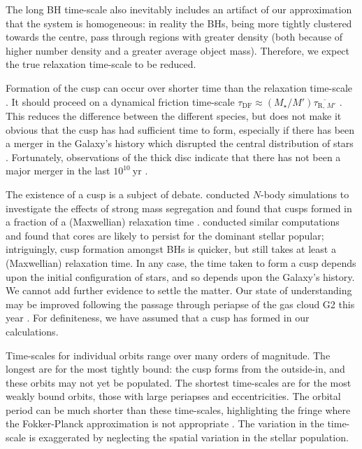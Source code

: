 \documentclass[useAMS,usedcolumn,usegraphicx,usenatbib]{mn2e}
\newcommand{\units}[1]{\ensuremath{~\mathrm{#1}}}
\newcommand{\sub}[1]{\ensuremath{_\mathrm{#1}}}
\begin{document}
\begin{onecolumn}
The long BH time-scale also inevitably includes an artifact of our approximation that the system is homogeneous: in reality the BHs, being more tightly clustered towards the centre, pass through regions with greater density (both because of higher number density and a greater average object mass). Therefore, we expect the true relaxation time-scale to be reduced. 

Formation of the cusp can occur over shorter time than the relaxation time-scale \citep{Bar-Or2012}. It should proceed on a dynamical friction time-scale $\tau\sub{DF} \approx (M_\star/M')\overline{\tau_{\mathrm{R},\,M'}}$ \citep[section 3.4]{Spitzer1987}. This reduces the difference between the different species, but does not make it obvious that the cusp has had sufficient time to form, especially if there has been a merger in the Galaxy's history which disrupted the central distribution of stars \citep{Gualandris2012}. Fortunately, observations of the thick disc indicate that there has not been a major merger in the last $10^{10}\units{yr}$ \citep{Wyse2008}.

The existence of a cusp is a subject of debate. \citet{Preto2010} conducted $N$-body simulations to investigate the effects of strong mass segregation \citep{Alexander2009, Keshet2009} and found that cusps formed in a fraction of a (Maxwellian) relaxation time \citep{Amaro-Seoane2011}. \citet{Gualandris2012} conducted similar computations and found that cores are likely to persist for the dominant stellar popular; intriguingly, cusp formation amongst BHs is quicker, but still takes at least a (Maxwellian) relaxation time. In any case, the time taken to form a cusp depends upon the initial configuration of stars, and so depends upon the Galaxy's history. We cannot add further evidence to settle the matter. Our state of understanding may be improved following the passage through periapse of the gas cloud G2 this year \citep{Bartos2013}. For definiteness, we have assumed that a cusp has formed in our calculations.

Time-scales for individual orbits range over many orders of magnitude. The longest are for the most tightly bound: the cusp forms from the outside-in, and these orbits may not yet be populated. The shortest time-scales are for the most weakly bound orbits, those with large periapses and eccentricities. The orbital period can be much shorter than these time-scales, highlighting the fringe where the Fokker-Planck approximation is not appropriate \citep{Spitzer1972}. The variation in the time-scale is exaggerated by neglecting the spatial variation in the stellar population.


\end{onecolumn}
\end{document}
